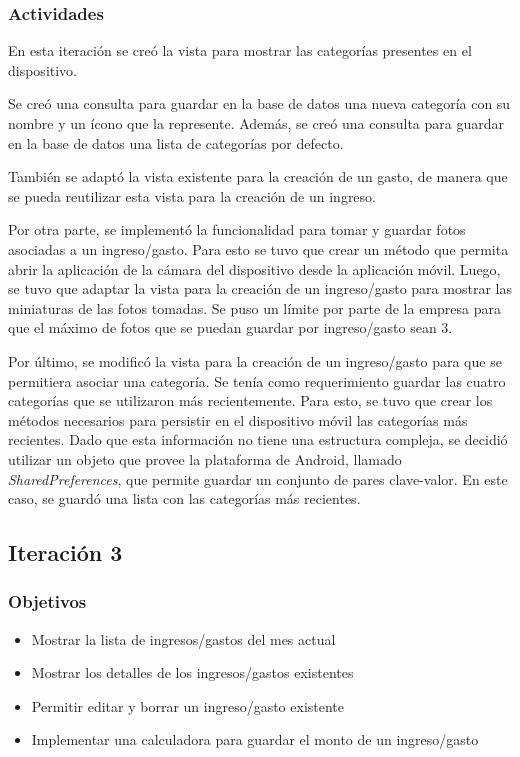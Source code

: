 \subsubsection{Actividades}

En esta iteración se creó la vista para mostrar las categorías presentes en el dispositivo.

Se creó una consulta para guardar en la base de datos una nueva categoría con su nombre y un ícono que la represente. Además, se creó una consulta para guardar en la base de datos una lista de categorías por defecto.

También se adaptó la vista existente para la creación de un gasto, de manera que se pueda reutilizar esta vista para la creación de un ingreso. 

Por otra parte, se implementó la funcionalidad para tomar y guardar fotos asociadas a un ingreso/gasto. Para esto se tuvo que crear un método que permita abrir la aplicación de la cámara del dispositivo desde la aplicación móvil. Luego, se tuvo que adaptar la vista para la creación de un ingreso/gasto para mostrar las miniaturas de las fotos tomadas. Se puso un límite por parte de la empresa para que el máximo de fotos que se puedan guardar por ingreso/gasto sean 3.

Por último, se modificó la vista para la creación de un ingreso/gasto para que se permitiera asociar una categoría. Se tenía como requerimiento guardar las cuatro categorías que se utilizaron más recientemente. Para esto, se tuvo que crear los métodos necesarios para persistir en el dispositivo móvil las categorías más recientes. Dado que esta información no tiene una estructura compleja, se decidió utilizar un objeto que provee la plataforma de Android, llamado \textit{SharedPreferences}, que permite guardar un conjunto de pares clave-valor. En este caso, se guardó una lista con las categorías más recientes.

\subsection{Iteración 3}
\subsubsection{Objetivos}
\begin{itemize}
\item Mostrar la lista de ingresos/gastos del mes actual
\item Mostrar los detalles de los ingresos/gastos existentes
\item Permitir editar y borrar un ingreso/gasto existente
\item Implementar una calculadora para guardar el monto de un ingreso/gasto
\end{itemize}

